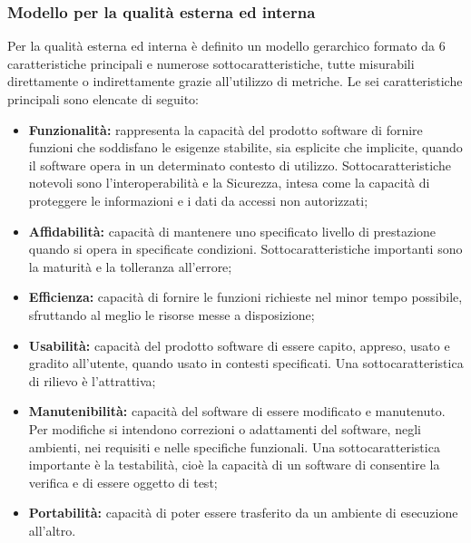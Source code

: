 	  \subsubsection{Modello per la qualità esterna ed interna}
	  Per la qualità esterna ed interna è definito un modello gerarchico formato da 6 caratteristiche principali e numerose sottocaratteristiche, tutte misurabili direttamente o indirettamente grazie all'utilizzo di metriche.
	  Le sei caratteristiche principali sono elencate di seguito:
	  \begin{itemize}
	  \item \textbf{Funzionalità:} rappresenta la capacità del prodotto software di fornire funzioni che soddisfano le esigenze stabilite, sia esplicite che implicite, quando il software opera in un determinato contesto di utilizzo. Sottocaratteristiche notevoli sono l'interoperabilità e la Sicurezza, intesa come la capacità di proteggere le informazioni e i dati da accessi non autorizzati;
	  \item \textbf{Affidabilità:} capacità di mantenere uno specificato livello di prestazione quando si opera in specificate condizioni. Sottocaratteristiche importanti sono la maturità e la tolleranza all'errore;
	  \item \textbf{Efficienza:} capacità di fornire le funzioni richieste nel minor tempo possibile, sfruttando al meglio le risorse messe a disposizione;
	  \item \textbf{Usabilità:} capacità del prodotto software di essere capito, appreso, usato e gradito all'utente, quando usato in contesti specificati. Una sottocaratteristica di rilievo è l'attrattiva;
	  \item \textbf{Manutenibilità:} capacità del software di essere modificato e manutenuto. Per modifiche si intendono correzioni o adattamenti del software, negli ambienti, nei requisiti e nelle specifiche funzionali. Una sottocaratteristica importante è la testabilità, cioè la capacità di un software di consentire la verifica e di essere oggetto di test;
	  \item \textbf{Portabilità:} capacità di poter essere trasferito da un ambiente di esecuzione all'altro.
	  \end{itemize}
